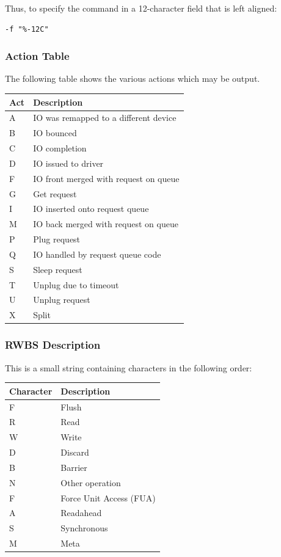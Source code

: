 \documentclass{article}
\begin{document}
Thus, to specify the command in a 12-character field that is left aligned:

\begin{verbatim}
-f "%-12C"
\end{verbatim}

\newpage
\subsubsection{\label{sec:act-table}Action Table}
The following table shows the various actions which may be output.

\begin{tabular}{|l|l|}\hline
Act & Description \\ \hline\hline
A & IO was remapped to a different device \\ \hline
B & IO bounced \\ \hline
C & IO completion \\ \hline
D & IO issued to driver \\ \hline
F & IO front merged with request on queue \\ \hline
G & Get request \\ \hline
I & IO inserted onto request queue \\ \hline
M & IO back merged with request on queue \\ \hline
P & Plug request \\ \hline
Q & IO handled by request queue code \\ \hline
S & Sleep request \\ \hline
T & Unplug due to timeout \\ \hline
U & Unplug request \\ \hline
X & Split \\ \hline
\end{tabular}

\subsubsection{\label{sec:act-table}RWBS Description}
This is a small string containing characters in the following order:

\begin{tabular}{|l|l|}\hline
Character & Description \\ \hline\hline
F & Flush \\ \hline
R & Read \\ \hline
W & Write \\ \hline
D & Discard \\ \hline
B & Barrier \\ \hline
N & Other operation \\ \hline
F & Force Unit Access (FUA) \\ \hline
A & Readahead \\ \hline
S & Synchronous \\ \hline
M & Meta \\ \hline
\end{tabular}
\end{document}
